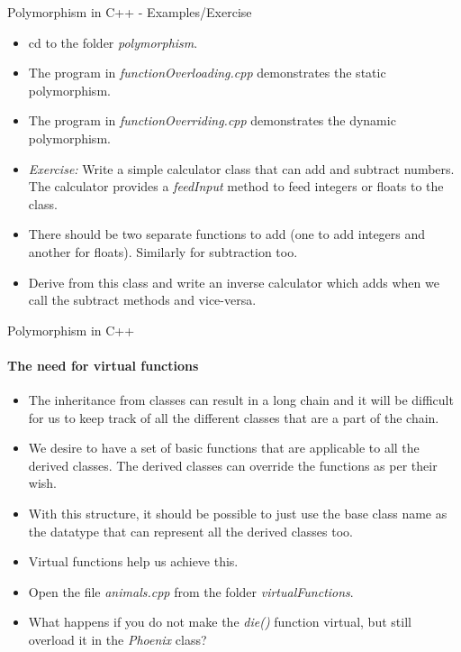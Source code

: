 \documentclass[aspectratio=169]{beamer}
\begin{document}
\begin{frame}[fragile]{Polymorphism in C++ - Examples/Exercise}
	\begin{itemize}
		\item cd to the folder \textit{polymorphism}.
		\item The program in \textit{functionOverloading.cpp} demonstrates the static polymorphism.
		\item The program in \textit{functionOverriding.cpp} demonstrates the dynamic polymorphism.
		\item \textit{Exercise:} Write a simple calculator class that can add and subtract numbers. The calculator provides a \textit{feedInput} method to feed integers or floats to the class.
		\item There should be two separate functions to add (one to add integers and another for floats). Similarly for subtraction too.
		\item Derive from this class and write an inverse calculator which adds when we call the subtract methods and vice-versa.
	\end{itemize}
\end{frame}

\begin{frame}[fragile]{Polymorphism in C++}
	\framesubtitle{The need for virtual functions}
	\begin{itemize}
		\item The inheritance from classes can result in a long chain and it will be difficult for us to keep track of all the different classes that are a part of the chain.
		\item We desire to have a set of basic functions that are applicable to all the derived classes. The derived classes can override the functions as per their wish.
		\item With this structure, it should be possible to just use the base class name as the datatype that can represent all the derived classes too.
		\item Virtual functions help us achieve this.
		\item Open the file \textit{animals.cpp} from the folder \textit{virtualFunctions}.
		\item What happens if you do not make the \textit{die()} function virtual, but still overload it in the \textit{Phoenix} class?
	\end{itemize}
\end{frame}
\end{document}
